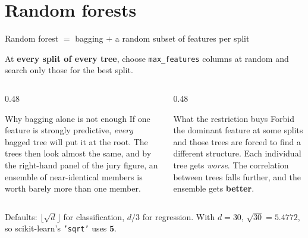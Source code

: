 \documentclass[aspectratio=169]{beamer}
\begin{document}
\section[Forests]{Random forests}
\label{sec:rf}

\begin{frame}[shrink=4]{Random forest $=$ bagging $+$ a random subset of features per split}
  \begin{exampleblock}{}
    \centering
    At \textbf{every split of every tree}, choose \texttt{max\_features}
    columns at random and search only those for the best split.
  \end{exampleblock}
  \begin{columns}[T]
    \begin{column}{0.48\textwidth}
      \begin{block}{Why bagging alone is not enough}
        If one feature is strongly predictive, \emph{every} bagged tree will
        put it at the root. The trees then look almost the same, and by the
        right-hand panel of the jury figure, an ensemble of near-identical
        members is worth barely more than one member.
      \end{block}
    \end{column}
    \begin{column}{0.48\textwidth}
      \begin{alertblock}{What the restriction buys}
        Forbid the dominant feature at some splits and those trees are forced
        to find a different structure. Each individual tree gets
        \emph{worse}. The correlation between trees falls further, and the
        ensemble gets \textbf{better}.
      \end{alertblock}
    \end{column}
  \end{columns}
  \begin{center}\small
    Defaults: $\lfloor\sqrt{d}\rfloor$ for classification, $d/3$ for
    regression. With $d = 30$, $\sqrt{30} = 5.4772$, so scikit-learn's
    \texttt{'sqrt'} uses $\mathbf{5}$.
  \end{center}
\end{frame}
\end{document}
